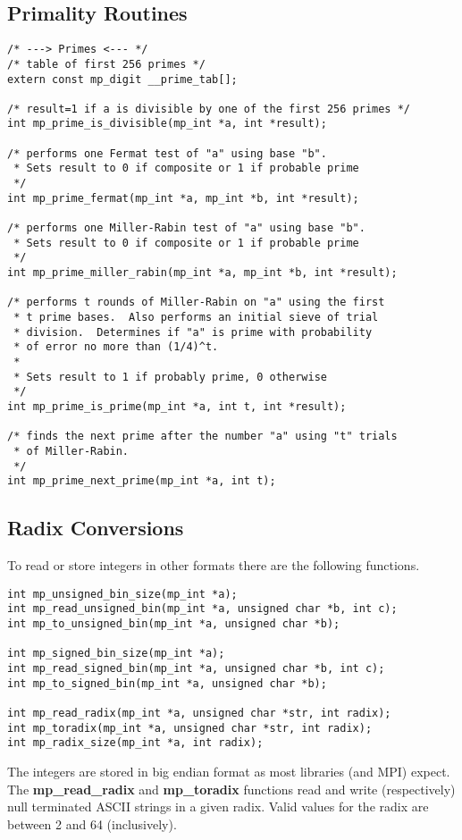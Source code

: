\documentclass{article}
\begin{document}
\subsection{Primality Routines}
\begin{verbatim}
/* ---> Primes <--- */
/* table of first 256 primes */
extern const mp_digit __prime_tab[];

/* result=1 if a is divisible by one of the first 256 primes */
int mp_prime_is_divisible(mp_int *a, int *result);

/* performs one Fermat test of "a" using base "b".  
 * Sets result to 0 if composite or 1 if probable prime 
 */
int mp_prime_fermat(mp_int *a, mp_int *b, int *result);

/* performs one Miller-Rabin test of "a" using base "b".
 * Sets result to 0 if composite or 1 if probable prime 
 */
int mp_prime_miller_rabin(mp_int *a, mp_int *b, int *result);

/* performs t rounds of Miller-Rabin on "a" using the first
 * t prime bases.  Also performs an initial sieve of trial
 * division.  Determines if "a" is prime with probability
 * of error no more than (1/4)^t.
 *
 * Sets result to 1 if probably prime, 0 otherwise
 */
int mp_prime_is_prime(mp_int *a, int t, int *result);

/* finds the next prime after the number "a" using "t" trials
 * of Miller-Rabin.
 */
int mp_prime_next_prime(mp_int *a, int t);
\end{verbatim}

\subsection{Radix Conversions}
To read or store integers in other formats there are the following functions.

\begin{verbatim}
int mp_unsigned_bin_size(mp_int *a);
int mp_read_unsigned_bin(mp_int *a, unsigned char *b, int c);
int mp_to_unsigned_bin(mp_int *a, unsigned char *b);

int mp_signed_bin_size(mp_int *a);
int mp_read_signed_bin(mp_int *a, unsigned char *b, int c);
int mp_to_signed_bin(mp_int *a, unsigned char *b);

int mp_read_radix(mp_int *a, unsigned char *str, int radix);
int mp_toradix(mp_int *a, unsigned char *str, int radix);
int mp_radix_size(mp_int *a, int radix);
\end{verbatim}

The integers are stored in big endian format as most libraries (and MPI) expect.  The \textbf{mp\_read\_radix} and 
\textbf{mp\_toradix} functions read and write (respectively) null terminated ASCII strings in a given radix.  Valid values
for the radix are between 2 and 64 (inclusively).  
\end{document}
